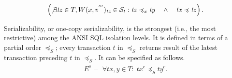 \documentclass[acmlarge, ,11pt]{acmart}
\begin{document}
\begin{align}
\begin{split}
    \left( \not \exists \mathit{tz} \in T, W(x,v^{'''})_{\mathit{tz}} \in  \mathcal{S}_t: 
   \mathit{tz} \preccurlyeq_x {\mathit{ty}} \quad \wedge \quad \mathit{tx} \preccurlyeq {\mathit{tz}} \right).
\end{split}
  \end{align}
 \par Serializability, or one-copy serializability, is the strongest (i.e., the most restrictive) among the ANSI SQL isolation levels. It is defined in terms of a partial order $\preccurlyeq_S$; every transaction $\mathit{t}$ in $\preccurlyeq_S$ returns result of the latest transaction preceding $\mathit{t}$ in $\preccurlyeq_S$.  It can be specified as follows.  
  \begin{align}\label{eqn:serial}
\begin{split}
 E^{s} =  \; \forall {\mathit{tx}}, \mathit{y} \in T: \;
\mathit{tx}^{c} \preccurlyeq_S \mathit{ty}^{c}. %
\end{split}
  \end{align}%
\end{document}
